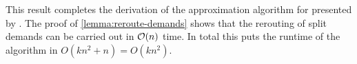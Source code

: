 This result completes the derivation of the approximation algorithm for \RL presented by \citet{schrijver99}.
The proof of \cref{lemma:reroute-demands} shows that the rerouting of split demands can be carried out in $\mathcal{O}(n)$ time.
In total this puts the runtime of the algorithm in $O(k n^2 + n) = O(k n^2)$. 